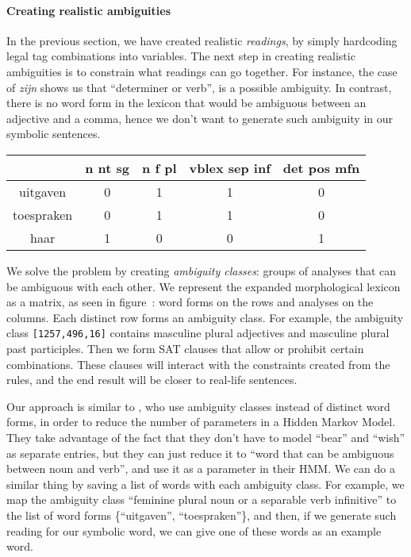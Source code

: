 \paragraph{Creating realistic ambiguities}




In the previous section, we have created realistic \emph{readings}, by simply hardcoding legal tag combinations into variables. The next step in creating realistic ambiguities is to constrain what readings can go together. For instance, the case of \emph{zijn} shows us that ``determiner or verb'', is a possible ambiguity. In contrast, there is no word form in the lexicon that would be ambiguous between an adjective and a comma, hence we don't want to generate such ambiguity in our symbolic sentences.

\begin{center}
\begin{tabular}{c|c|c|c|c}


            & n nt sg  & n f pl  &  vblex sep inf & det pos mfn  \\ \hline
uitgaven    & 0        & 1       & 1              & 0    \\ 
toespraken  & 0        & 1       & 1              & 0    \\ 
haar        & 1        & 0       & 0              & 1    \\ 


\end{tabular}
\end{center}

We solve the problem by creating \emph{ambiguity classes}: groups of analyses that can be ambiguous with each other. 
We represent the expanded morphological lexicon as a matrix, as seen in figure~: word forms on the rows and analyses on the columns. Each distinct row forms an ambiguity class. For example, the ambiguity class \verb![1257,496,16]! %
contains masculine plural adjectives and masculine plural past participles.
Then we form SAT clauses that allow or prohibit certain combinations. These clauses will interact with the constraints created from the rules, and the end result will be closer to real-life sentences.

Our approach is similar to , who use ambiguity classes instead of distinct word forms, in order to reduce the number of parameters in a Hidden Markov Model. They take advantage of the fact that they don't have to model ``bear'' and ``wish'' as separate entries, but they can just reduce it to ``word that can be ambiguous between noun and verb'', and use it as a parameter in their HMM. 
We can do a similar thing by saving a list of words with each ambiguity class. For example, we map the ambiguity class ``feminine plural noun or a separable verb infinitive'' to the list of word forms \{``uitgaven'', ``toespraken''\}, and then, if we generate such reading for our symbolic word, we can give one of these words as an example word.


